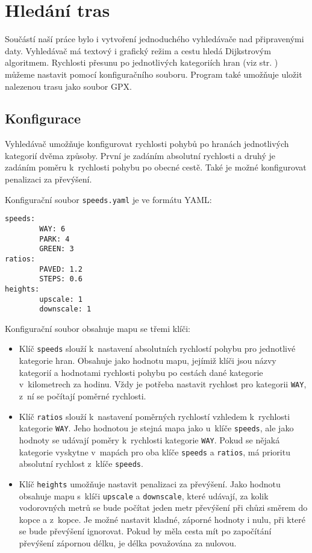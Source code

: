\chapter{Hledání tras}
Součástí naší práce bylo i vytvoření jednoduchého vyhledávače nad připravenými
daty. Vyhledávač má textový i grafický režim a cestu hledá Dijkstrovým
algoritmem. Rychlosti přesunu po jednotlivých kategoriích hran (viz str.
\pageref{label:kategorie}) můžeme nastavit pomocí konfiguračního souboru.
Program také umožňuje uložit nalezenou trasu jako soubor GPX. \cite{gpxspec}  

\section{Konfigurace}
Vyhledávač umožňuje konfigurovat rychlosti pohybů po hranách jednotlivých
kategorií dvěma způsoby. První je zadáním absolutní rychlosti a druhý je zadáním
poměru k~rychlosti pohybu po obecné cestě. Také je možné konfigurovat penalizaci
za převýšení.

Konfigurační soubor \verb|speeds.yaml| je ve formátu YAML: \cite{yamlspec} 
\begin{verbatim}
speeds:
        WAY: 6
        PARK: 4
        GREEN: 3
ratios:
        PAVED: 1.2
        STEPS: 0.6
heights:
        upscale: 1
        downscale: 1
\end{verbatim}
Konfigurační soubor obsahuje mapu se třemi klíči:
\begin{itemize}
	\item Klíč \verb|speeds| slouží k~nastavení absolutních rychlostí pohybu
	pro jednotlivé kategorie hran. Obsahuje jako hodnotu mapu, jejímiž klíči jsou
	názvy kategorií a hodnotami rychlosti pohybu po cestách dané kategorie
v~kilometrech za hodinu. Vždy je potřeba nastavit rychlost pro kategorii
	\verb|WAY|, z~ní se počítají poměrné rychlosti.
	\item Klíč \verb|ratios| slouží k~nastavení poměrných rychlostí vzhledem
	k~rychlosti kategorie \verb|WAY|. Jeho hodnotou je stejná mapa jako
u~klíče \verb|speeds|, ale jako hodnoty se udávají poměry k~rychlosti
	kategorie \verb|WAY|. Pokud se nějaká kategorie vyskytne v~mapách pro
	oba klíče \verb|speeds| a \verb|ratios|, má prioritu absolutní rychlost
	z~klíče \verb|speeds|.
	\item Klíč \verb|heights| umožňuje nastavit penalizaci za převýšení.
	Jako hodnotu obsahuje mapu s~klíči \verb|upscale| a \verb|downscale|,
	které udávají, za kolik vodorovných metrů se bude počítat jeden metr
	převýšení při chůzi směrem do kopce a z~kopce. Je možné nastavit kladné,
	záporné hodnoty i nulu, při které se bude převýšení ignorovat. Pokud by
	měla cesta mít po započítání převýšení zápornou délku, je délka
	považována za nulovou.
\end{itemize}

